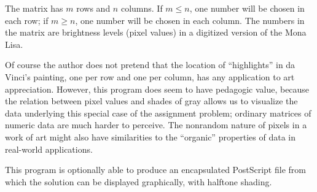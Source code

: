 The matrix has $m$ rows and $n$ columns. If $m\le n$, one number will
be chosen in each row; if $m\ge n$, one number will be chosen in each column.
The numbers in the matrix are brightness levels (pixel values) in
a digitized version of the Mona Lisa.

Of course the author does not pretend that the location of ``highlights'' in
da Vinci's painting, one per row and one per column, has any application
to art appreciation. However, this program does seem to have pedagogic value,
because the relation between pixel values and shades of gray allows us
to visualize the data underlying this special case of the
assignment problem; ordinary matrices of numeric data are much harder
to perceive. The nonrandom nature of pixels
in a work of art might also have similarities to the ``organic'' properties
of data in real-world applications.

This program is optionally able to produce an encapsulated PostScript file
from which the solution can be displayed graphically, with halftone shading.

\fi

